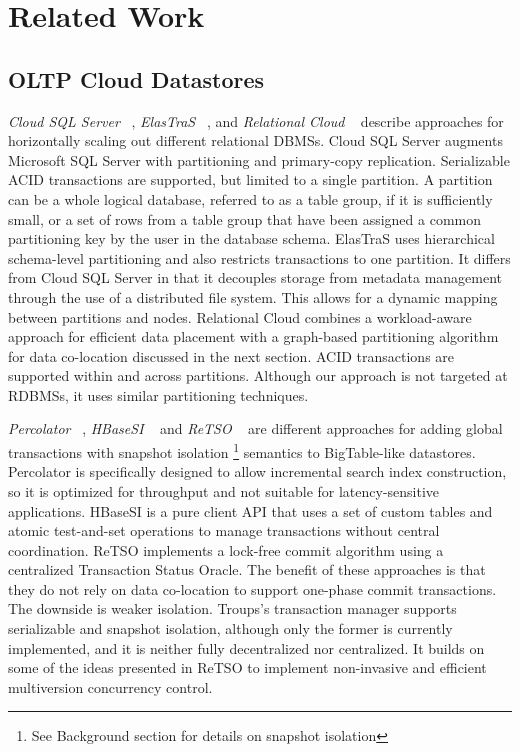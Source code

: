 \documentclass[10pt,final,journal]{IEEEtran}
\begin{document}
\section{Related Work}
		
\subsection{OLTP Cloud Datastores}
\emph{Cloud SQL Server} ~\cite{Campbell:2010:ESF:1807167.1807280, Bernstein:2011:AMS:2004686.2005651}, \emph{ElasTraS} ~\cite{Das:2009:EET:1855533.1855540, Das:2010:EAE}, and \emph{Relational Cloud} ~\cite{Curino:2011:JPMWMBZ11} describe approaches for horizontally scaling out different relational DBMSs. Cloud SQL Server augments Microsoft SQL Server with partitioning and primary-copy replication. Serializable ACID transactions are supported, but limited to a single partition. A partition can be a whole logical database, referred to as a table group, if it is sufficiently small, or a set of rows from a table group that have been assigned a common partitioning key by the user in the database schema. ElasTraS uses hierarchical schema-level partitioning and also restricts transactions to one partition. It differs from Cloud SQL Server in that it decouples storage from metadata management through the use of a distributed file system. This allows for a dynamic mapping between partitions and nodes. Relational Cloud combines a workload-aware approach for efficient data placement with a graph-based partitioning algorithm for data co-location discussed in the next section. ACID transactions are supported within and across partitions. Although our approach is not targeted at RDBMSs, it uses similar partitioning techniques.

\emph{Percolator} ~\cite{Peng:2010:LIP:1924943.1924961}, \emph{HBaseSI} ~\cite{Zhang:2010:5697970} and \emph{ReTSO} ~\cite{Junqueira:2011:LTS:2056318.2057148} are different approaches for adding global transactions with snapshot isolation \footnote{See Background section for details on snapshot isolation} semantics to BigTable-like datastores. Percolator is specifically designed to allow incremental search index construction, so it is optimized for throughput and not suitable for latency-sensitive applications. HBaseSI is a pure client API that uses a set of custom tables and atomic test-and-set operations to manage transactions without central coordination. ReTSO implements a lock-free commit algorithm using a centralized Transaction Status Oracle. The benefit of these approaches is that they do not rely on data co-location to support one-phase commit transactions. The downside is weaker isolation. Troups's transaction manager supports serializable and snapshot isolation, although only the former is currently implemented, and it is neither fully decentralized nor centralized. It builds on some of the ideas presented in ReTSO to implement non-invasive and efficient multiversion concurrency control.
\end{document}
